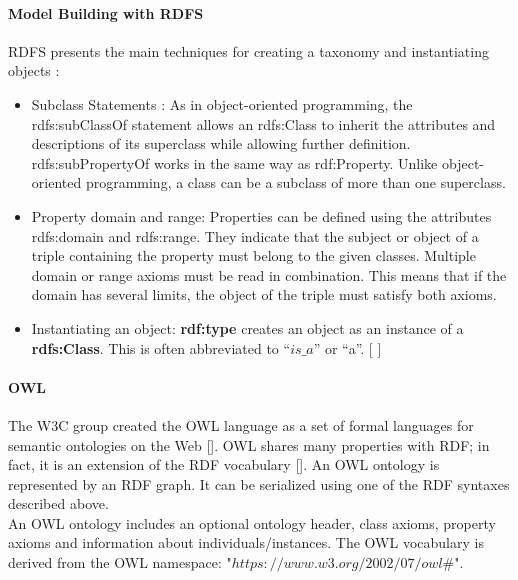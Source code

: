                 
        
        
            \paragraph{Model Building with RDFS}
            RDFS presents the main techniques for creating a taxonomy and instantiating objects \cite{spelten2023simulation} : 

            \begin{itemize}
                \item Subclass Statements : As in object-oriented programming, the rdfs:subClassOf statement allows an rdfs:Class to inherit the attributes and descriptions of its superclass while allowing further definition. rdfs:subPropertyOf works in the same way as rdf:Property. Unlike object-oriented programming, a class can be a subclass of more than one superclass. 
                \item Property domain and range: Properties can be defined using the attributes rdfs:domain and rdfs:range. They indicate that the subject or object of a triple containing the property must belong to the given classes. Multiple domain or range axioms must be read in combination. This means that if the domain has several limits, the object of the triple must satisfy both axioms. 
                \item Instantiating an object: \textbf{rdf:type} creates an object as an instance of a \textbf{rdfs:Class}. This is often abbreviated to “$is\_a$” or “a”. [ ] 
            \end{itemize}
    
            \paragraph{OWL}
            The W3C group created the OWL language as a set of formal languages for semantic ontologies on the Web []. OWL shares many properties with RDF; in fact, it is an extension of the RDF vocabulary []. An OWL ontology is represented by an RDF graph. It can be serialized using one of the RDF syntaxes described above. \\
        
            An OWL ontology includes an optional ontology header, class axioms, property axioms and information about individuals/instances. The OWL vocabulary is derived from the OWL namespace: "$https://www.w3.org/2002/07/owl\#$". 
        
